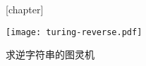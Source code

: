 \documentclass[nofonts]{ctexart}
\begin{document}
[chapter]
\begin{flowchart}
	\centering
	\texttt{[image: turing-reverse.pdf]}
	\caption{求逆字符串的图灵机}
\end{flowchart}
\end{document}
